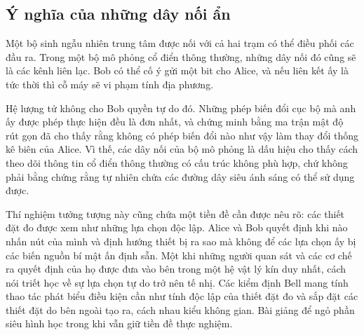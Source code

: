 \subsection{Ý nghĩa của những dây nối ẩn}

Một bộ sinh ngẫu nhiên trung tâm được nối với cả hai trạm có thể điều phối các đầu ra. Trong một bộ mô phỏng cổ điển thông thường, những dây nối đó cũng sẽ là các kênh liên lạc. Bob có thể cố ý gửi một bit cho Alice, và nếu liên kết ấy là tức thời thì cỗ máy sẽ vi phạm tính địa phương.

Hệ lượng tử không cho Bob quyền tự do đó. Những phép biến đổi cục bộ mà anh ấy được phép thực hiện đều là đơn nhất, và chứng minh bằng ma trận mật độ rút gọn đã cho thấy rằng không có phép biến đổi nào như vậy làm thay đổi thống kê biên của Alice. Vì thế, các dây nối của bộ mô phỏng là dấu hiệu cho thấy cách theo dõi thông tin cổ điển thông thường có cấu trúc không phù hợp, chứ không phải bằng chứng rằng tự nhiên chứa các đường dây siêu ánh sáng có thể sử dụng được.

\begin{classroomqa}
\end{classroomqa}

\begin{classroomqa}
\end{classroomqa}

Thí nghiệm tưởng tượng này cũng chứa một tiền đề cần được nêu rõ: các thiết đặt đo được xem như những lựa chọn độc lập. Alice và Bob quyết định khi nào nhấn nút của mình và định hướng thiết bị ra sao mà không để các lựa chọn ấy bị các biến nguồn bí mật ấn định sẵn. Một khi những người quan sát và các cơ chế ra quyết định của họ được đưa vào bên trong một hệ vật lý kín duy nhất, cách nói triết học về sự lựa chọn tự do trở nên tế nhị. Các kiểm định Bell mang tính thao tác phát biểu điều kiện cần như tính độc lập của thiết đặt đo và sắp đặt các thiết đặt do bên ngoài tạo ra, cách nhau kiểu không gian. Bài giảng để ngỏ phần siêu hình học trong khi vẫn giữ tiền đề thực nghiệm.


